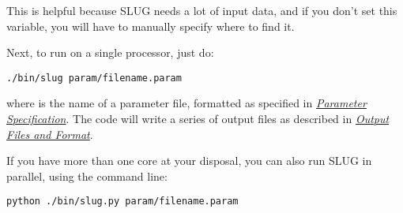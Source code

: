 \documentclass[letterpaper,10pt,english]{sphinxmanual}
\begin{document}
This is helpful because SLUG needs a lot of input data, and if you don't set this variable, you will have to manually specify where to find it.

Next, to run on a single processor, just do:

\begin{Verbatim}[commandchars=\\\{\}]
./bin/slug param/filename.param
\end{Verbatim}

where  is the name of a parameter file, formatted as specified in {\hyperref[parameters:sec-parameters]{\emph{Parameter Specification}}}. The code will write a series of output files as described in {\hyperref[output:sec-output]{\emph{Output Files and Format}}}.

If you have more than one core at your disposal, you can also run SLUG in parallel, using the command line:

\begin{Verbatim}[commandchars=\\\{\}]
python ./bin/slug.py param/filename.param
\end{Verbatim}
\end{document}
